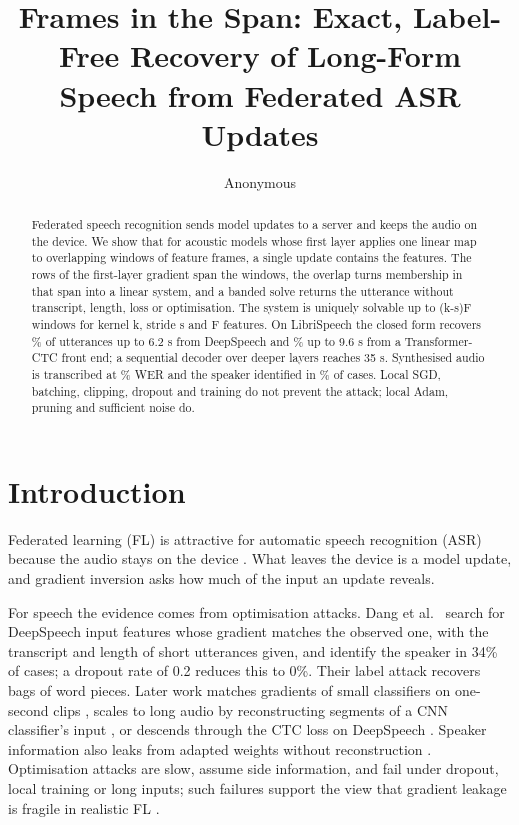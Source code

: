 \documentclass{Interspeech}
\title{Frames in the Span: Exact, Label-Free Recovery of Long-Form Speech from Federated ASR Updates}
\author[affiliation={1}]{Anonymous}{Author}
\begin{document}
\maketitle

\begin{abstract}
Federated speech recognition sends model updates to a server and keeps the audio on the device. We show
that for acoustic models whose first layer applies one linear map to overlapping windows of feature
frames, a single update contains the features. The rows of the first-layer gradient span the windows,
the overlap turns membership in that span into a linear system, and a banded solve returns the
utterance without transcript, length, loss or optimisation. The system is uniquely solvable up to
(k-s)F windows for kernel k, stride s and F features. On LibriSpeech the closed form recovers
\DSshortSucc\% of utterances up to 6.2 s from DeepSpeech and \TFSucc\% up to 9.6 s from a
Transformer-CTC front end; a sequential decoder over deeper layers reaches 35 s. Synthesised audio is
transcribed at \WerShort\% WER and the speaker identified in \SpkShort\% of cases. Local SGD, batching,
clipping, dropout and training do not prevent the attack; local Adam, pruning and sufficient noise do.
\end{abstract}

\section{Introduction}

Federated learning (FL) \cite{mcmahan2017communication} is attractive for automatic speech recognition
(ASR) because the audio stays on the device \cite{guliani2021training,nguyen2023federated,pelikan2025enabling}.
What leaves the device is a model update, and gradient inversion \cite{zhu2019dlg,geiping2020inverting}
asks how much of the input an update reveals.

For speech the evidence comes from optimisation attacks. Dang et al.\ \cite{dang2022speaker} search for
DeepSpeech \cite{hannun2014deep} input features whose gradient matches the observed one, with the
transcript and length of short utterances given, and identify the speaker in 34\% of cases; a dropout
rate of 0.2 reduces this to 0\%. Their label attack \cite{dang2021revealing} recovers bags of word
pieces. Later work matches gradients of small classifiers on one-second clips
\cite{li2023speech,ovi2024gradient}, scales to long audio by reconstructing segments of a CNN classifier's
input \cite{zeng2025recover}, or descends through the CTC loss \cite{graves2006connectionist} on
DeepSpeech \cite{bui2025reconstructing}. Speaker information also leaks from adapted weights without
reconstruction \cite{tomashenko2022privacy}. Optimisation attacks are slow, assume side information, and
fail under dropout, local training or long inputs; such failures support the view that gradient leakage
is fragile in realistic FL \cite{du2025sok,huang2021evaluating}.
\end{document}
